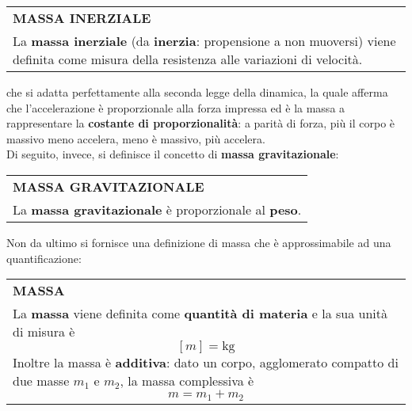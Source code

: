 \documentclass[a4paper]{extarticle}
\renewcommand\arraystretch{}
\begin{document}
\vspace{1em}
\setlength{\tabcolsep}{14pt}
\renewcommand{\arraystretch}{2}
\noindent
\begin{tabularx}{\textwidth}{@{}|P|@{}}
    \hline
    {\textbf{MASSA INERZIALE}}\\
    \parbox{\linewidth}{La \textbf{massa inerziale} (da \textbf{inerzia}: propensione a non muoversi) viene definita come misura della resistenza alle variazioni di velocità.
    \vspace{3mm}}\\
    \hline
\end{tabularx}
\vspace{1em}

\noindent
che si adatta perfettamente alla seconda legge della dinamica, la quale afferma che l'accelerazione è proporzionale alla forza impressa ed è la massa a rappresentare la \textbf{costante di proporzionalità}: a parità di forza, più il corpo è massivo meno accelera, meno è massivo, più accelera.\\
Di seguito, invece, si definisce il concetto di \textbf{massa gravitazionale}:

\vspace{1em}
\setlength{\tabcolsep}{14pt}
\renewcommand{\arraystretch}{2}
\noindent
\begin{tabularx}{\textwidth}{@{}|P|@{}}
    \hline
    {\textbf{MASSA GRAVITAZIONALE}}\\
    \parbox{\linewidth}{La \textbf{massa gravitazionale} è proporzionale al \textbf{peso}.
    \vspace{3mm}}\\
    \hline
\end{tabularx}
\vspace{1em}

\noindent
Non da ultimo si fornisce una definizione di massa che è approssimabile ad una quantificazione:

\vspace{1em}
\setlength{\tabcolsep}{14pt}
\renewcommand{\arraystretch}{2}
\noindent
\begin{tabularx}{\textwidth}{@{}|P|@{}}
    \hline
    {\textbf{MASSA}}\\
    \parbox{\linewidth}{La \textbf{massa} viene definita come \textbf{quantità di materia} e la sua unità di misura è
    \[[m] = \text{kg}\]
    Inoltre la massa è \textbf{additiva}: dato un corpo, agglomerato compatto di due masse $m_1$ e $m_2$, la massa complessiva è
    \[m = m_1 + m_2\]
    \vspace{-1mm}}\\
    \hline
\end{tabularx}
\vspace{1em}
\end{document}
